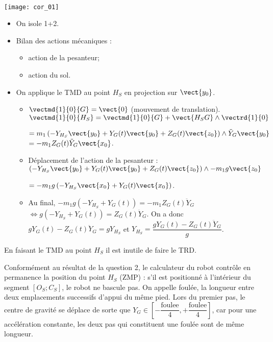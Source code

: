 \begin{multicols}{2}
\ifprof
\begin{corrige} ~\\

\begin{center}
\texttt{[image: cor\_01]}
\end{center}

\begin{itemize}
\item On isole 1+2.
\item Bilan des actions mécaniques :
\begin{itemize}
\item action de la pesanteur;
\item action du sol.
\end{itemize}
\item On applique le TMD au point $H_S$ en projection sur $\vect{y_0}$. 
\begin{itemize}
\item $\vectmd{1}{0}{G}=\vect{0}$ (mouvement de translation). $\vectmd{1}{0}{H_S}=\vectmd{1}{0}{G}+\vect{H_S G}\wedge \vectrd{1}{0}$ 

$=m_1\left(-Y_{H_S}\vect{y_0}+Y_G(t)\vect{y_0}+Z_G(t)\vect{z_0}\right) \wedge \ddot{Y}_G\vect{y_0}$
$=-m_1Z_G(t) \ddot{Y}_G\vect{x_0}$.

\item Déplacement de l'action de la pesanteur : $\left(-Y_{H_S}\vect{y_0}+Y_G(t)\vect{y_0}+Z_G(t)\vect{z_0}\right) \wedge - m_1 g \vect{z_0} $

  $= - m_1 g \left(-Y_{H_S}\vect{x_0}+Y_G(t)\vect{x_0}\right) $.
  \item Au final, $- m_1 g \left(-Y_{H_S}+Y_G(t)\right) = -m_1Z_G(t) \ddot{Y}_G$ 
  $\Leftrightarrow   g \left(-Y_{H_S}+Y_G(t)\right) = Z_G(t) \ddot{Y}_G$. On a donc $gY_G(t)- Z_G(t) \ddot{Y}_G=gY_{H_S}$ et $Y_{H_S} = \dfrac{gY_G(t)- Z_G(t) \ddot{Y}_G}{g}$.
\end{itemize}
\end{itemize}

En faisant le TMD au point $H_S$ il est inutile de faire le TRD. 
\end{corrige}
\else
\fi


\ifprof
\else

Conformément au résultat de la question 2, le calculateur du robot contrôle en permanence la position du
point $H_S$ (ZMP) : s'il est positionné à l'intérieur du segment $[O_S ;C_S ]$, le robot ne bascule pas.
On appelle foulée, la longueur entre deux emplacements successifs d'appui du même pied. Lors du premier
pas, le centre de gravité se déplace de sorte que $Y_G \in \left[ -\dfrac{\text{foulee}}{4},+\dfrac{\text{foulee}}{4}\right]$, car pour une accélération constante, les deux pas qui constituent une foulée sont de même longueur.


\end{multicols}
